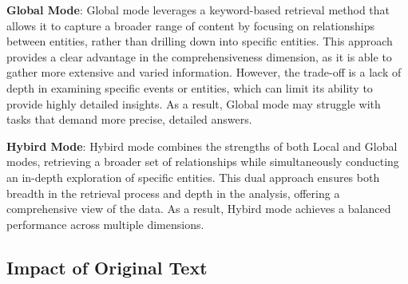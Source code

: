 \documentclass{article} %
\begin{document}
\textbf{Global Mode}: Global mode leverages a keyword-based retrieval method that allows it to capture a broader range of content by focusing on relationships between entities, rather than drilling down into specific entities. This approach provides a clear advantage in the comprehensiveness dimension, as it is able to gather more extensive and varied information. However, the trade-off is a lack of depth in examining specific events or entities, which can limit its ability to provide highly detailed insights. As a result, Global mode may struggle with tasks that demand more precise, detailed answers.

\textbf{Hybird Mode}: Hybird mode combines the strengths of both Local and Global modes, retrieving a broader set of relationships while simultaneously conducting an in-depth exploration of specific entities. This dual approach ensures both breadth in the retrieval process and depth in the analysis, offering a comprehensive view of the data. As a result, Hybird mode achieves a balanced performance across multiple dimensions.

\subsection{Impact of Original Text}
\end{document}
